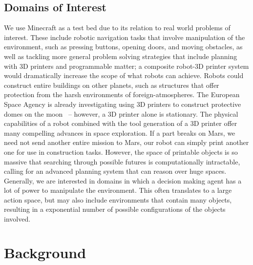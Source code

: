 \documentclass[11pt]{article}
\begin{document}
\subsection{Domains of Interest}
We use Minecraft as a test bed due to its relation to real world problems of interest. These include robotic navigation tasks that involve manipulation of the environment, such as pressing buttons, opening doors, and moving obstacles, as well as tackling more general problem solving strategies that include planning with 3D printers and programmable matter; a composite robot-3D printer system would dramatically increase the scope of what robots can achieve. Robots could construct entire buildings on other planets, such as structures that offer protection from the harsh environments of foreign-atmospheres. The European Space Agency is already investigating using 3D printers to construct protective domes on the moon~\cite{ceccanti20103D,Cesaretti2014430} -- however, a 3D printer alone is stationary. The physical capabilities of a robot combined with the tool generation of a 3D printer offer many compelling advances in space exploration. If a part breaks on Mars, we need not send another entire mission to Mars, our robot can simply print another one for use in construction tasks. However, the space of printable objects is so massive that searching through possible futures is computationally intractable, calling for an advanced planning system that can reason over huge spaces. Generally, we are interested in domains in which a decision making agent has a lot of power to manipulate the environment. This often translates to a large action space, but may also include environments that contain many objects, resulting in a exponential number of possible configurations of the objects involved.



\section{Background}
\label{sec:background}
\end{document}
